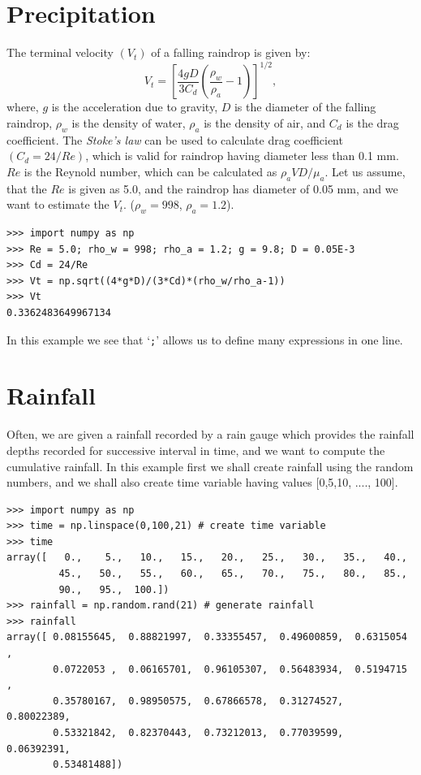 \documentclass[10pt]{book}
\begin{document}
{\section{Precipitation}
The terminal velocity $(V_t)$ of a falling raindrop is given by:
\begin{equation}
V_t = \left[\frac{4gD}{3C_d}\left( \frac{\rho_w}{\rho_a}-1\right) \right]^{1/2},
\end{equation}
where, $g$ is the acceleration due to gravity, $D$ is the diameter of the falling raindrop, $\rho_w$ is the density of water, $\rho_a$ is the density of air, and $C_d$ is the drag coefficient. The \emph{Stoke's law} can be used to calculate drag coefficient $(C_d = 24/Re)$, which is valid for raindrop having diameter less than 0.1 mm. $Re$ is the Reynold number, which can be calculated as $\rho_a VD/\mu_a$. Let us assume, that the $Re$ is given as 5.0, and the raindrop has diameter of 0.05 mm, and we want to estimate the $V_t$. ($\rho_w = 998$, $\rho_a=1.2$).
\beforeverb
\begin{verbatim}
>>> import numpy as np
>>> Re = 5.0; rho_w = 998; rho_a = 1.2; g = 9.8; D = 0.05E-3
>>> Cd = 24/Re
>>> Vt = np.sqrt((4*g*D)/(3*Cd)*(rho_w/rho_a-1))
>>> Vt
0.3362483649967134
\end{verbatim}
\afterverb
In this example we see that `\verb";"' allows us to define many expressions in one line.

\section{Rainfall}
Often, we are given a rainfall recorded by a rain gauge which provides the rainfall depths recorded for successive interval in time, and we want to compute the cumulative rainfall. In this example first we shall create rainfall using the random numbers, and we shall also create time variable having values [0,5,10, ...., 100]. 
\beforeverb \begin{verbatim}
>>> import numpy as np
>>> time = np.linspace(0,100,21) # create time variable
>>> time
array([   0.,    5.,   10.,   15.,   20.,   25.,   30.,   35.,   40.,
         45.,   50.,   55.,   60.,   65.,   70.,   75.,   80.,   85.,
         90.,   95.,  100.])
>>> rainfall = np.random.rand(21) # generate rainfall
>>> rainfall
array([ 0.08155645,  0.88821997,  0.33355457,  0.49600859,  0.6315054 ,
        0.0722053 ,  0.06165701,  0.96105307,  0.56483934,  0.5194715 ,
        0.35780167,  0.98950575,  0.67866578,  0.31274527,  0.80022389,
        0.53321842,  0.82370443,  0.73212013,  0.77039599,  0.06392391,
        0.53481488])
\end{verbatim} \afterverb

}
\end{document}
